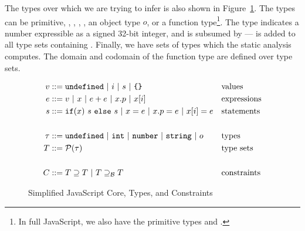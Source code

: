 The types over which we are trying to infer is also shown in
Figure~\ref{fig:js-core}. The types can be primitive, ,
, , , an object type $o$, or a function
type\footnote{In full JavaScript, we also have the primitive types 
  and .}. The  type indicates a number expressible as a
signed 32-bit integer, and is subsumed by  ---  is
added to all type sets containing . Finally, we have sets of
types which the static analysis computes. The domain and codomain of the
function type are defined over type sets.

\newcommand{\barrier}{\supseteq_\mathcal{B}}

\begin{figure}
\begin{align*}
v & ::= \code{undefined}\ |\ i\ |\ s\ |\ \text{\code{\{\}}} && \text{values}\\
e & ::= v\ |\ x\ |\ e + e\ |\ x.p\ |\ x[i]\ && \text{expressions}\\
s & ::= \code{if}(x)\ s\ \code{else}\ s\ |\ x = e\ |\ x.p = e\ |\ x[i] = e && \text{statements}\\
\\
\tau & ::= \code{undefined}\ |\ \code{int}\ |\ \code{number}\ |\ \code{string}\ |\ o && \text{types}\\
T & ::= \mathcal{P}(\tau) && \text{type sets}\\
\\
C & ::= T \supseteq T\ |\ T \barrier T && \text{constraints}
\end{align*}
\caption{Simplified JavaScript Core, Types, and Constraints}
\label{fig:js-core}
\end{figure}

